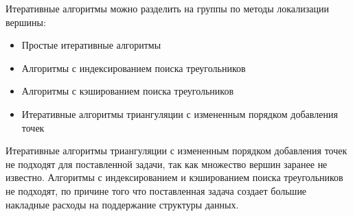 \documentclass{fefu}
\begin{document}
Итеративные алгоритмы можно разделить на группы по методы локализации вершины:
\begin{itemize}
    \item Простые итеративные алгоритмы
    \item Алгоритмы с индексированием поиска треугольников
    \item Алгоритмы с кэшированием поиска треугольников
    \item Итеративные алгоритмы триангуляции с измененным порядком добавления точек
\end{itemize}
 Итеративные алгоритмы триангуляции с измененным порядком добавления точек не подходят для поставленной задачи, так как
 множество вершин заранее не известно. Алгоритмы с индексированием и кэшированием поиска треугольников не подходят, по
 причине того что поставленная задача создает большие накладные расходы на поддержание структуры данных.
\end{document}
